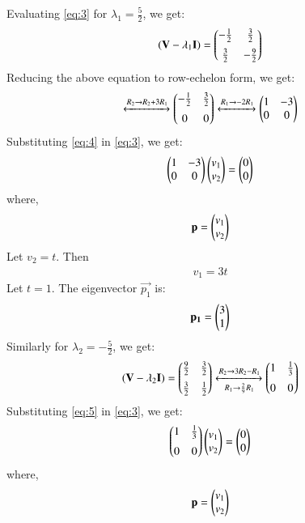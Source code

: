 \documentclass[journal,12pt,twocolumn]{IEEEtran}
\begin{document}
Evaluating \eqref{eq:3} for $\lambda_1 = \frac{5}{2}$, we get:
\begin{align}
  (\mathbf{V} - \lambda_1 \mathbf{I})  = \begin{pmatrix}-\frac{1}{2} & \frac{3}{2} \\[0.2cm]\frac{3}{2} & -\frac{9}{2}\end{pmatrix}
\end{align}
Reducing the above equation to row-echelon form, we get:
\begin{align}
  \xleftrightarrow[]{R_2 \rightarrow R_2 + 3R_1} \begin{pmatrix}-\frac{1}{2} & \frac{3}{2} \\[0.2cm]0 & 0\end{pmatrix} \xleftrightarrow[]{R_1 \rightarrow -2R_1} \begin{pmatrix}1 & -3 \\ 0 & 0\end{pmatrix} \label{eq:4}
\end{align}
Substituting \eqref{eq:4} in \eqref{eq:3}, we get:
\begin{align}
  \begin{pmatrix}1 & -3 \\ 0 & 0\end{pmatrix} \begin{pmatrix}v_1 \\ v_2\end{pmatrix} = \begin{pmatrix}0 \\ 0\end{pmatrix}
\end{align}
where,
\begin{align}
  \mathbf{p} = \begin{pmatrix}v_1 \\ v_2\end{pmatrix}
\end{align}
Let $v_2 = t$. Then
\begin{align}
  v_1 = 3t
\end{align}
Let $t = 1$. The eigenvector $\vec{p_1}$ is:
\begin{align}
  \mathbf{p_1} = \begin{pmatrix}3 \\ 1\end{pmatrix}
\end{align}
Similarly for $\lambda_2 = -\frac{5}{2}$, we get:
\begin{align}
    (\mathbf{V} - \lambda_2 \mathbf{I})  = \begin{pmatrix}\frac{9}{2} & \frac{3}{2} \\[0.2cm]\frac{3}{2} & \frac{1}{2}\end{pmatrix} \xleftrightarrow[R_1 \rightarrow \frac{2}{9}R_1]{R_2 \rightarrow 3R_2 - R_1} \begin{pmatrix}1 & \frac{1}{3} \\[0.2cm]0 & 0\end{pmatrix} \label{eq:5}
\end{align}
Substituting \eqref{eq:5} in \eqref{eq:3}, we get:
\begin{align}
  \begin{pmatrix}1 & \frac{1}{3} \\[0.2cm]0 & 0\end{pmatrix} \begin{pmatrix}v_1 \\ v_2\end{pmatrix} = \begin{pmatrix}0 \\ 0\end{pmatrix}
\end{align}
where,
\begin{align}
  \mathbf{p} = \begin{pmatrix}v_1 \\ v_2\end{pmatrix}
\end{align}
\end{document}
